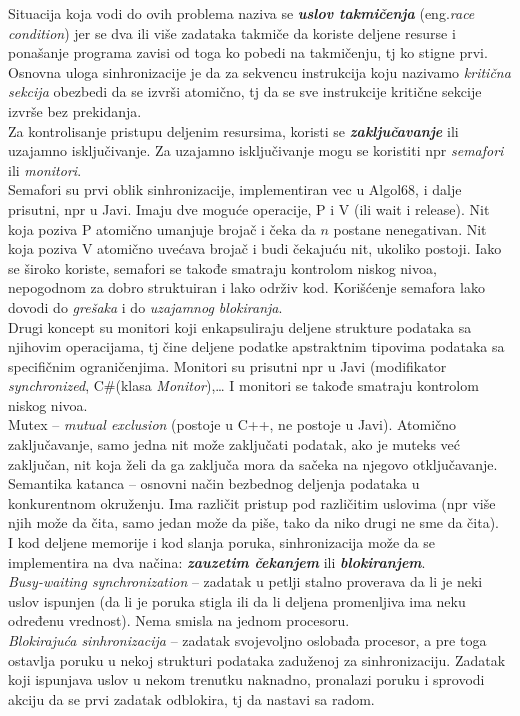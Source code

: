 \documentclass[../main.tex]{subfiles}
\begin{document}
Situacija koja vodi do ovih problema naziva se {\it \bf uslov takmičenja} (eng.{\it race condition}) jer se dva ili više zadataka takmiče da koriste deljene resurse i ponašanje programa zavisi od toga ko pobedi na takmičenju, tj ko stigne prvi. Osnovna uloga sinhronizacije je da za sekvencu instrukcija koju nazivamo {\it kritična sekcija} obezbedi da se izvrši atomično, tj da se sve instrukcije kritične sekcije izvrše bez prekidanja.
\\
\indent Za kontrolisanje pristupu deljenim resursima, koristi se {\it \bf zaključavanje} ili uzajamno isključivanje. Za uzajamno isključivanje mogu se koristiti npr {\it semafori} ili {\it monitori}.
\\
Semafori su prvi oblik sinhronizacije, implementiran vec u Algol68, i dalje prisutni, npr u Javi. Imaju dve moguće operacije, P i V (ili wait i release). Nit koja poziva P atomično umanjuje brojač i čeka da $n$ postane nenegativan. Nit koja poziva V atomično uvećava brojač i budi čekajuću nit, ukoliko postoji. Iako se široko koriste, semafori se takođe smatraju kontrolom niskog nivoa, nepogodnom za dobro struktuiran i lako održiv kod. Korišćenje semafora lako dovodi do {\it grešaka} i do {\it uzajamnog blokiranja}.
\\
Drugi koncept su monitori koji enkapsuliraju deljene strukture podataka sa njihovim operacijama, tj čine deljene podatke apstraktnim tipovima podataka sa specifičnim ograničenjima. Monitori su prisutni npr u Javi (modifikator {\it synchronized}, C\#(klasa {\it Monitor}),\ldots
I monitori se takođe smatraju kontrolom niskog nivoa.
\\
Mutex -- {\it mutual exclusion} (postoje u C++, ne postoje u Javi).
Atomično zaključavanje, samo jedna nit može zaključati podatak, ako je muteks već zaključan, nit koja želi da ga zaključa mora da sačeka na njegovo otključavanje. \\
Semantika katanca -- osnovni način bezbednog deljenja podataka u konkurentnom okruženju. Ima različit pristup pod različitim uslovima (npr više njih može da čita, samo jedan može da piše, tako da niko drugi ne sme da čita).
\\
\indent I kod deljene memorije i kod slanja poruka, sinhronizacija može da se implementira na dva načina: {\it \bf zauzetim čekanjem} ili {\it \bf blokiranjem}.
\\
{\it Busy-waiting synchronization} -- zadatak u petlji stalno proverava da li je neki uslov ispunjen (da li je poruka stigla ili da li deljena promenljiva ima neku određenu vrednost). Nema smisla na jednom procesoru.
\\
{\it Blokirajuća sinhronizacija} -- zadatak svojevoljno oslobađa procesor, a pre toga ostavlja poruku u nekoj strukturi podataka zaduženoj za sinhronizaciju. Zadatak koji ispunjava uslov u nekom trenutku naknadno, pronalazi poruku i sprovodi akciju da se prvi zadatak odblokira, tj da nastavi sa radom.
\end{document}
